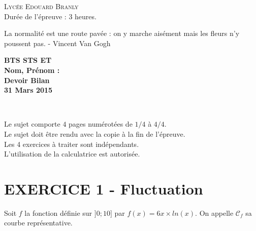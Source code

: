 \documentclass[12pt]{article}
\begin{document}
\setlength{\columnseprule}{0pt}

  \textsc{\LARGE Lycée Edouard Branly}\\[1.0cm] %
  {\huge Durée de l'épreuve : 3 heures.}\\[0.5cm]

\noindent\hrulefill

\begin{center}
  \textsf{La normalité est une route pavée : on y marche aisément mais les fleurs n'y poussent pas. - Vincent Van Gogh}\\
\end{center}

\noindent\hrulefill

\begin{minipage}[t]{\textwidth}
  \raggedright
      {\bfseries BTS STS ET}\\
      {\bfseries Nom, Prénom : }\\[.35ex]
      \vspace*{-1cm}
      \raggedleft
          {\bfseries Devoir Bilan}\\[.35ex]
          {\bfseries 31 Mars 2015}\\[.35ex]
\end{minipage}\\[1em]

\noindent\hrulefill

\noindent\hrulefill

  \begin{minipage}{\textwidth}
    \begin{flushright} 
      Le sujet comporte $4$  pages numérotées de   $1/4$   à  $4/4$.\\
      Le sujet doit être rendu avec la copie à la fin de l’épreuve.\\
      Les 4 exercices à traiter sont indépendants.\\
      L'utilisation de la calculatrice est autorisée.\\
    \end{flushright}
  \end{minipage}


\section*{EXERCICE 1 - Fluctuation}



Soit $f$ la fonction définie sur $]0 ; 10]$ par $f(x) = 6x \times ln(x)$. On appelle $\mathcal{C}_f$ sa courbe représentative.
\end{document}
